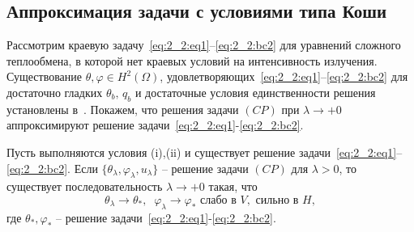 \subsection{Аппроксимация задачи с условиями типа Коши}
\label{subsec:ch2/sec2/approximation}

Рассмотрим краевую задачу~\eqref{eq:2_2:eq1}--\eqref{eq:2_2:bc2} для
уравнений сложного теплообмена, в которой нет краевых условий
на интенсивность излучения.
Существование $\theta,\varphi\in H^2(\Omega)$,
удовлетворяющих~\eqref{eq:2_2:eq1}--\eqref{eq:2_2:bc2} для достаточно гладких
$\theta_b,\, q_b$ и достаточные условия единственности решения
установлены в~\cite{CMMP20}.
Покажем, что решения задачи $(CP)$ при $\lambda\to+0$
аппроксимируют решение задачи~\eqref{eq:2_2:eq1}-\eqref{eq:2_2:bc2}.


\begin{theorem}
    \label{th:2_2:3}
    Пусть выполняются условия (i),(ii) и существует решение
    задачи~\eqref{eq:2_2:eq1}--\eqref{eq:2_2:bc2}.
    Если $\{\theta_\lambda,\varphi_\lambda,u_\lambda\}$ -- решение
    задачи $(CP)$ для $\lambda>0$, то существует последовательность $\lambda\to +0$
    такая, что
    \[
        \theta_\lambda\rightarrow\theta_*, \;\; \varphi_\lambda\rightarrow\varphi_*
        \text{ слабо в }V,\text{ сильно в }H,
    \]
    где $\theta_*,\varphi_*$ -- решение задачи~\eqref{eq:2_2:eq1}-\eqref{eq:2_2:bc2}.
\end{theorem}

